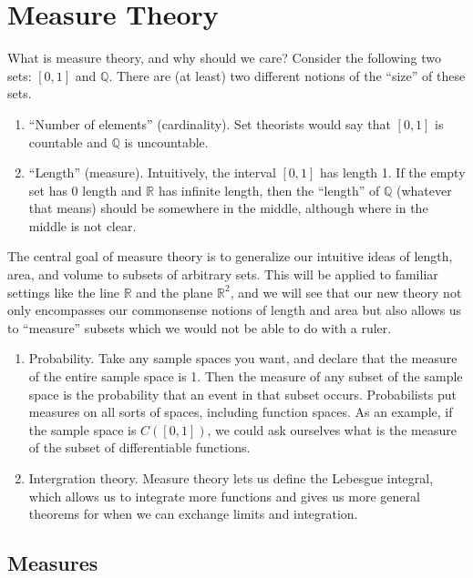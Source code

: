 \documentclass[12pt]{amsart}         %
\theoremstyle{remark}
\newcommand{\R}{\mathbb{R}}
\newcommand{\Q}{\mathbb{Q}}
\begin{document}
\section{Measure Theory}

What is measure theory, and why should we care? Consider the following two sets: $[0, 1]$ and $\Q$. There are (at least) two different notions of the ``size'' of these sets.
\begin{enumerate}
    \item ``Number of elements'' (cardinality). Set theorists would say that $[0, 1]$ is countable and $\Q$ is uncountable. 
    \item ``Length'' (measure). Intuitively, the interval $[0, 1]$ has length 1. If the empty set has 0 length and $\R$ has infinite length, then the ``length'' of $\Q$ (whatever that means) should be somewhere in the middle, although where in the middle is not clear.
\end{enumerate}

The central goal of measure theory is to generalize our intuitive ideas of length, area, and volume to subsets of arbitrary sets. This will be applied to familiar settings like the line $\R$ and the plane $\R^2$, and we will see that our new theory not only encompasses our commonsense notions of length and area but also allows us to ``measure'' subsets which we would not be able to do with a ruler.

\begin{enumerate}
	\item Probability. Take any sample spaces you want, and declare that the measure of the entire sample space is 1. Then the measure of any subset of the sample space is the probability that an event in that subset occurs. Probabilists put measures on all sorts of spaces, including function spaces. As an example, if the sample space is $C([0, 1])$, we could ask ourselves what is the measure of the subset of differentiable functions.

	\item Intergration theory. Measure theory lets us define the Lebesgue integral, which allows us to integrate more functions and gives us more general theorems for when we can exchange limits and integration.
\end{enumerate}

\subsection{Measures}
\end{document}
